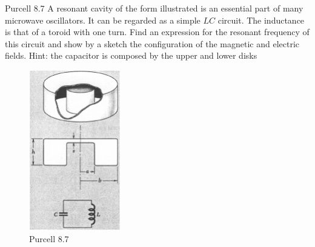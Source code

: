 \documentclass[makesolutionspdf]{esg8022pset}
\begin{document}
\begin{problem}{Purcell 8.7}
 A resonant cavity of the form illustrated is an essential part of many microwave oscillators. It can be regarded as a simple $LC$ circuit. The inductance is that of a toroid with one turn. Find an expression for the resonant frequency of this circuit and show by a sketch the configuration of the magnetic and electric fields.
 Hint: the capacitor is composed by the upper and lower disks
 \begin{figure}[H]
    \centering
    \includegraphics[width = 4cm]{pu807}
    \caption{Purcell 8.7}
    \label{fig:cavity2}
  \end{figure}
  
\end{problem}
\end{document}
